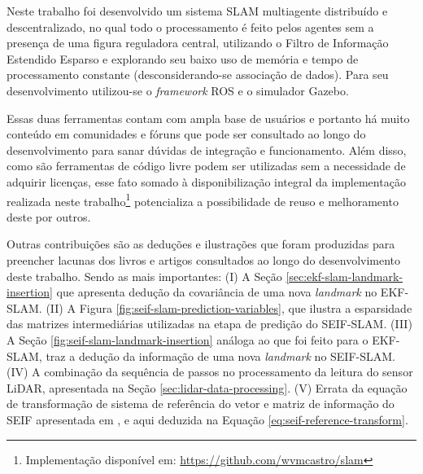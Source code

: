 Neste trabalho foi desenvolvido um sistema SLAM multiagente distribuído e 
descentralizado, no qual todo o processamento é feito pelos agentes sem a presença de uma figura reguladora central, utilizando o Filtro de Informação Estendido Esparso e explorando seu baixo uso de memória e tempo de processamento constante (desconsiderando-se associação de dados). Para seu desenvolvimento utilizou-se o \textit{framework} ROS e o 
simulador Gazebo.

Essas duas ferramentas contam com ampla base de usuários e portanto há 
muito conteúdo em comunidades e fóruns que pode ser consultado ao longo 
do desenvolvimento para sanar dúvidas de integração e funcionamento. 
Além disso, como são ferramentas de código livre podem ser utilizadas 
sem a necessidade de adquirir licenças, esse fato somado à 
disponibilização integral da implementação realizada neste trabalho\footnote{Implementação disponível em: \url{https://github.com/wvmcastro/slam}} potencializa a 
possibilidade de reuso e melhoramento deste por outros. 

Outras contribuições são as deduções e ilustrações que 
foram produzidas para preencher lacunas dos livros e artigos 
consultados ao longo do desenvolvimento deste trabalho. Sendo as mais importantes: (I) A 
Seção \ref{sec:ekf-slam-landmark-insertion} que apresenta dedução da 
covariância de uma nova \textit{landmark} no EKF-SLAM. (II) A Figura 
\ref{fig:seif-slam-prediction-variables}, que ilustra a esparsidade das 
matrizes intermediárias utilizadas na etapa de predição do SEIF-SLAM. 
(III) A Seção \ref{fig:seif-slam-landmark-insertion} análoga ao que 
foi feito para o EKF-SLAM, traz a dedução da informação de uma nova 
\textit{landmark} no SEIF-SLAM. (IV) A combinação da sequência de passos 
no processamento da leitura do sensor LiDAR, apresentada na Seção \ref{sec:lidar-data-processing}. (V) Errata da equação de transformação de 
sistema de referência do vetor e matriz de informação do SEIF 
apresentada em \cite[Seção.~12.11.2]{thrun2005probabilistic}, e aqui 
deduzida na Equação \ref{eq:seif-reference-transform}.


